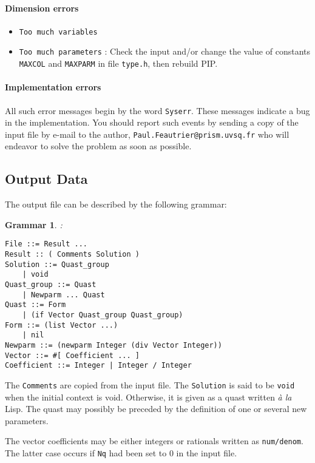 \documentclass[12pt,a4paper,dvips]{article}
\newtheorem{grammar}{Grammar}
\begin{document}
\paragraph{Dimension errors}
\begin{itemize}
\item {\tt Too much variables}

\item {\tt Too much parameters} : Check the input and/or change the value of
constants {\tt MAXCOL} and {\tt MAXPARM} in file {\tt type.h}, then
rebuild PIP.
\end{itemize}
\paragraph{Implementation errors}

All such error messages begin by the word {\tt Syserr}. These messages
indicate a bug in the implementation. You should report such events
by sending a copy of the input file by e-mail to the author, \linebreak
{\tt Paul.Feautrier@prism.uvsq.fr} who will endeavor to solve the problem
as soon as possible.

\subsection{Output Data}\label{OutputData}
The output file can be described by the following grammar:
\begin{grammar}\label{GrammarOutputData}
:
\label{resultat}
\begin{verbatim}
File ::= Result ...
Result :: ( Comments Solution )
Solution ::= Quast_group
    | void
Quast_group ::= Quast
    | Newparm ... Quast
Quast ::= Form
    | (if Vector Quast_group Quast_group)
Form ::= (list Vector ...)
    | nil
Newparm ::= (newparm Integer (div Vector Integer))
Vector ::= #[ Coefficient ... ]
Coefficient ::= Integer | Integer / Integer
\end{verbatim}
\end{grammar}
The {\tt Comments} are copied from the input file. The {\tt Solution}
is said to be {\tt void} when the initial context is void. Otherwise,
it is given as a quast written {\sl \`a la} Lisp. The quast may
possibly be preceded by the definition of one or several new
parameters.

The vector coefficients may be either integers or rationals written as
{\tt num/denom}. The latter case occurs if {\tt Nq} had been
set to 0 in the input file.
\end{document}
